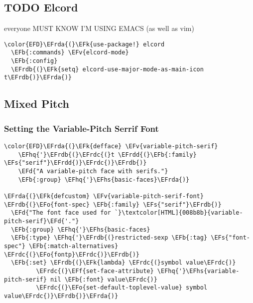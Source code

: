 \documentclass{article}
\newcommand{\EFs}[1]{\textcolor{EFs}{#1}} %
\newcommand{\EFd}[1]{\textcolor{EFd}{#1}} %
\newcommand{\EFk}[1]{\textcolor{EFk}{#1}} %
\newcommand{\EFb}[1]{\textcolor{EFb}{#1}} %
\newcommand{\EFf}[1]{\textcolor{EFf}{#1}} %
\newcommand{\EFv}[1]{\textcolor{EFv}{#1}} %
\newcommand{\EFo}[1]{\textcolor{EFo}{#1}} %
\newcommand{\EFhq}[1]{#1} %
\newcommand{\EFhs}[1]{\textcolor{EFhs}{#1}} %
\newcommand{\EFrda}[1]{\textcolor{EFrda}{#1}} %
\newcommand{\EFrdb}[1]{\textcolor{EFrdb}{#1}} %
\newcommand{\EFrdc}[1]{\textcolor{EFrdc}{#1}} %
\newcommand{\EFrdd}[1]{\textcolor{EFrdd}{#1}} %
\begin{document}
\subsection{{\bfseries\sffamily TODO} Elcord}
\label{sec:org0d572e2}
everyone MUST KNOW I'M USING EMACS (as well as vim)
\begin{Code}
\begin{Verbatim}
\color{EFD}\EFrda{(}\EFk{use-package!} elcord
  \EFb{:commands} \EFv{elcord-mode}
  \EFb{:config}
  \EFrdb{(}\EFk{setq} elcord-use-major-mode-as-main-icon t\EFrdb{)}\EFrda{)}
\end{Verbatim}
\end{Code}

\subsection{Mixed Pitch}
\label{sec:org55b1816}
\subsubsection{Setting the Variable-Pitch Serrif Font}
\label{sec:orged918bd}
\begin{Code}
\begin{Verbatim}
\color{EFD}\EFrda{(}\EFk{defface} \EFv{variable-pitch-serif}
    \EFhq{'}\EFrdb{(}\EFrdc{(}t \EFrdd{(}\EFb{:family} \EFs{"serif"}\EFrdd{)}\EFrdc{)}\EFrdb{)}
    \EFd{"A variable-pitch face with serifs."}
    \EFb{:group} \EFhq{'}\EFhs{basic-faces}\EFrda{)}

\EFrda{(}\EFk{defcustom} \EFv{variable-pitch-serif-font} \EFrdb{(}\EFo{font-spec} \EFb{:family} \EFs{"serif"}\EFrdb{)}
  \EFd{"The font face used for `}\textcolor[HTML]{008b8b}{variable-pitch-serif}\EFd{'."}
  \EFb{:group} \EFhq{'}\EFhs{basic-faces}
  \EFb{:type} \EFhq{'}\EFrdb{(}restricted-sexp \EFb{:tag} \EFs{"font-spec"} \EFb{:match-alternatives} \EFrdc{(}\EFo{fontp}\EFrdc{)}\EFrdb{)}
  \EFb{:set} \EFrdb{(}\EFk{lambda} \EFrdc{(}symbol value\EFrdc{)}
         \EFrdc{(}\EFf{set-face-attribute} \EFhq{'}\EFhs{variable-pitch-serif} nil \EFb{:font} value\EFrdc{)}
         \EFrdc{(}\EFo{set-default-toplevel-value} symbol value\EFrdc{)}\EFrdb{)}\EFrda{)}

\end{Verbatim}
\end{Code}
\end{document}
